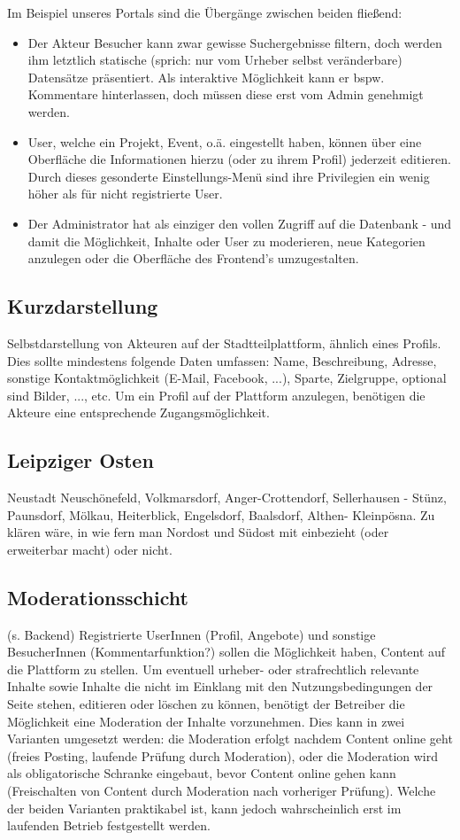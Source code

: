 \documentclass{swp}
\begin{document}
Im Beispiel unseres Portals sind die \"Uberg\"ange zwischen beiden flie{\ss}end:
\begin{itemize}
\item Der Akteur \glqq Besucher\grqq{} kann zwar gewisse Suchergebnisse filtern, doch werden ihm letztlich \glqq statische\grqq{} (sprich: nur vom Urheber selbst ver\"anderbare) Datens\"atze pr\"asentiert. Als interaktive M\"oglichkeit kann er bspw. Kommentare hinterlassen, doch m\"ussen diese erst vom \glqq Admin\grqq{} genehmigt werden.
\item User, welche ein Projekt, Event, o.\"a. eingestellt haben, k\"onnen \"uber eine Oberfl\"ache die Informationen hierzu (oder zu ihrem Profil) jederzeit editieren. Durch dieses gesonderte Einstellungs-Men\"u sind ihre Privilegien ein wenig h\"oher als f\"ur nicht registrierte User.
\item Der \glqq Administrator\grqq{} hat als einziger den vollen Zugriff auf die Datenbank - und damit die M\"oglichkeit, Inhalte oder User zu moderieren, neue Kategorien anzulegen oder die Oberfl\"ache des Frontend's umzugestalten.
\end{itemize}
\subsection{Kurzdarstellung}
Selbstdarstellung von Akteuren auf der Stadtteilplattform, \"ahnlich eines Profils. Dies sollte mindestens folgende Daten umfassen: Name, Beschreibung, Adresse, sonstige Kontaktm\"oglichkeit (E-Mail, Facebook, ...), Sparte, Zielgruppe, optional sind Bilder, ..., etc. Um ein Profil auf der Plattform anzulegen, ben\"otigen die Akteure eine entsprechende Zugangsm\"oglichkeit.
\subsection{Leipziger Osten}
Neustadt Neusch\"onefeld, Volkmarsdorf, Anger-Crottendorf, Sellerhausen - St\"unz, Paunsdorf, M\"olkau, Heiterblick, Engelsdorf, Baalsdorf, Althen- Kleinp\"osna. Zu kl\"aren w\"are, in wie fern man Nordost und S\"udost mit einbezieht (oder erweiterbar macht) oder nicht.
\subsection{Moderationsschicht}
(s. Backend) Registrierte UserInnen (Profil, Angebote) und sonstige BesucherInnen (Kommentarfunktion?) sollen die M\"oglichkeit haben, Content auf die Plattform zu stellen. Um eventuell urheber- oder strafrechtlich relevante Inhalte sowie Inhalte die nicht im Einklang mit den Nutzungsbedingungen der Seite stehen, editieren oder l\"oschen zu k\"onnen, ben\"otigt der Betreiber die M\"oglichkeit eine Moderation der Inhalte vorzunehmen. Dies kann in zwei Varianten umgesetzt werden: die Moderation erfolgt nachdem Content online geht (freies Posting, laufende Pr\"ufung durch Moderation), oder die Moderation wird als obligatorische Schranke eingebaut, bevor Content online gehen kann (Freischalten von Content durch Moderation nach vorheriger Pr\"ufung). Welche der beiden Varianten praktikabel ist, kann jedoch wahrscheinlich erst im laufenden Betrieb festgestellt werden. 
\end{document}
